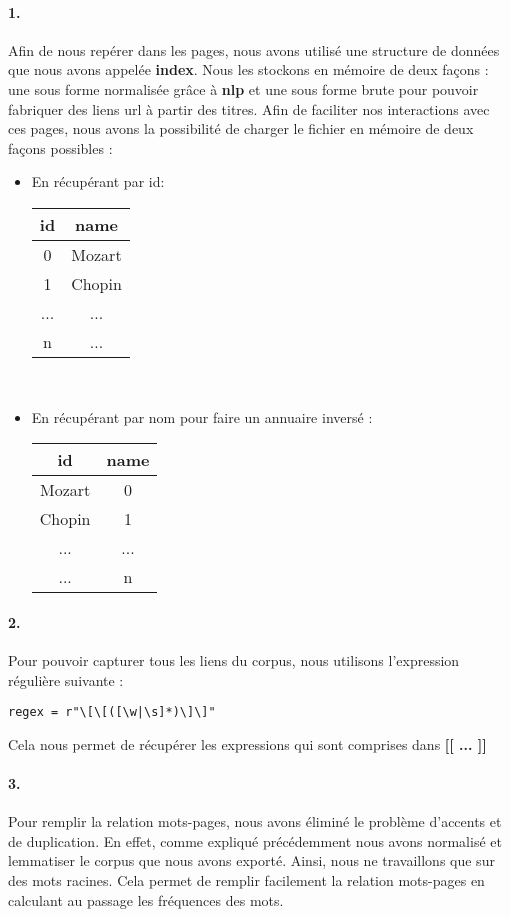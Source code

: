 \documentclass[10pt,a4paper]{article}
\begin{document}
\paragraph{1.}Afin de nous repérer dans les pages, nous avons utilisé une structure de données que nous avons appelée \textbf{index}. Nous les stockons en mémoire de deux façons : une sous forme normalisée grâce à \textbf{nlp} et une sous forme brute pour pouvoir fabriquer des liens url à partir des titres. Afin de faciliter nos interactions avec ces pages, nous avons la possibilité de charger le fichier en mémoire de deux façons possibles :
\begin{itemize}
\item En récupérant par id: \\ \begin{tabular}{ |c|c| } 
 \hline
 id & name \\
 \hline
 0  & Mozart \\
 1  & Chopin \\
 ...    & ... \\
 n  & ... \\
 \hline
 \end{tabular} \\
 \item En récupérant par nom pour faire un annuaire inversé : \\ \begin{tabular}{ |c|c| } 
 \hline
 id & name \\
 \hline
 Mozart & 0 \\
 Chopin & 1 \\
 ...    & ... \\
 ...    & n \\
 \hline
\end{tabular}
\end{itemize}

\paragraph{2.} Pour pouvoir capturer tous les liens du corpus, nous utilisons l'expression régulière suivante :
\begin{verbatim}
regex = r"\[\[([\w|\s]*)\]\]"
\end{verbatim}
Cela nous permet de récupérer les expressions qui sont comprises dans \textbf{[[ ... ]]}

\paragraph{3.}Pour remplir la relation mots-pages, nous avons éliminé le problème d'accents et de duplication. En effet, comme expliqué précédemment nous avons normalisé et lemmatiser le corpus que nous avons exporté. Ainsi, nous ne travaillons que sur des mots racines. Cela permet de remplir facilement la relation mots-pages en calculant au passage les fréquences des mots.
\end{document}
